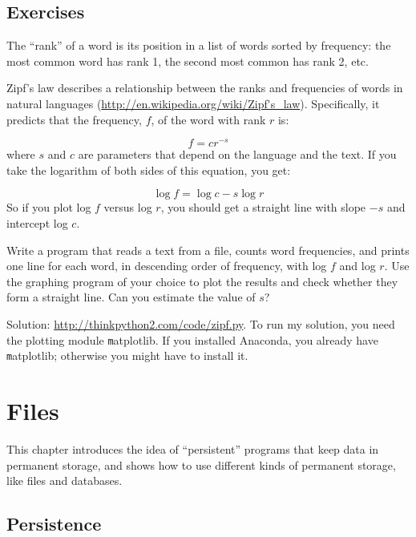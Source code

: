 \documentclass[
DIV=11,
fontsize=13,
twoside,
headinclude=false,
titlepage=firstiscover,
abstract=true,
headsepline=true,
footsepline=true,
chapterprefix=true, %
headings=big,
bibliography=totoc,%
captions=tableheading
]{scrbook}
\theoremstyle{definition}
\begin{document}
\section{Exercises}

\begin{exercise}
\normalfont
{}

The ``rank'' of a word is its position in a list of words
sorted by frequency: the most common word has rank 1, the
second most common has rank 2, etc.

Zipf's law describes a relationship between the ranks and frequencies
of words in natural languages
(\url{http://en.wikipedia.org/wiki/Zipf's_law}).  Specifically, it
predicts that the frequency, $f$, of the word with rank $r$ is:

\[ f = c r^{-s} \]
%
where $s$ and $c$ are parameters that depend on the language and the
text.  If you take the logarithm of both sides of this equation, you
get:

\[ \log f = \log c - s \log r \]
%
So if you plot log $f$ versus log $r$, you should get
a straight line with slope $-s$ and intercept log $c$.

Write a program that reads a text from a file, counts
word frequencies, and prints one line
for each word, in descending order of frequency, with
log $f$ and log $r$.  Use the graphing program of your
choice to plot the results and check whether they form
a straight line.  Can you estimate the value of $s$?

Solution: \url{http://thinkpython2.com/code/zipf.py}.
To run my solution, you need the plotting module {\texttt matplotlib}.
If you installed Anaconda, you already have {\texttt matplotlib};
otherwise you might have to install it.

\end{exercise}



\chapter{Files}

This chapter introduces the idea of ``persistent'' programs that
keep data in permanent storage, and shows how to use different
kinds of permanent storage, like files and databases.


\section{Persistence}
\end{document}
